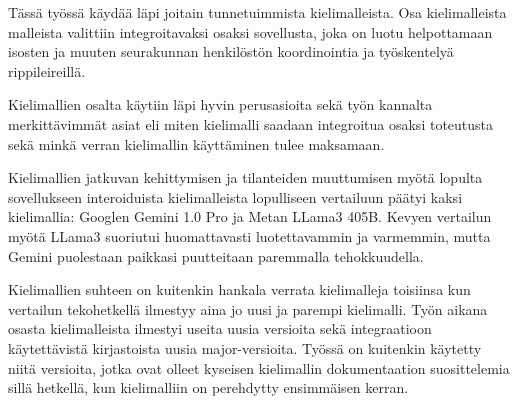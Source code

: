 Tässä työssä käydää läpi joitain tunnetuimmista kielimalleista. Osa
kielimalleista malleista valittiin integroitavaksi osaksi sovellusta, joka on
luotu helpottamaan isosten ja muuten seurakunnan henkilöstön koordinointia ja
työskentelyä rippileireillä.

Kielimallien osalta käytiin läpi hyvin perusasioita sekä työn kannalta
merkittävimmät asiat eli miten kielimalli saadaan integroitua osaksi toteutusta
sekä minkä verran kielimallin käyttäminen tulee maksamaan.

Kielimallien jatkuvan kehittymisen ja tilanteiden muuttumisen myötä lopulta
sovellukseen interoiduista kielimalleista lopulliseen vertailuun päätyi kaksi
kielimallia: Googlen Gemini 1.0 Pro ja Metan LLama3 405B. Kevyen vertailun
myötä LLama3 suoriutui huomattavasti luotettavammin ja varmemmin, mutta Gemini
puolestaan paikkasi puutteitaan paremmalla tehokkuudella.

Kielimallien suhteen on kuitenkin hankala verrata kielimalleja toisiinsa kun
vertailun tekohetkellä ilmestyy aina jo uusi ja parempi kielimalli. Työn aikana
osasta kielimalleista ilmestyi useita uusia versioita sekä integraatioon
käytettävistä kirjastoista uusia major-versioita. Työssä on kuitenkin käytetty
niitä versioita, jotka ovat olleet kyseisen kielimallin dokumentaation
suosittelemia sillä hetkellä, kun kielimalliin on perehdytty ensimmäisen
kerran.
